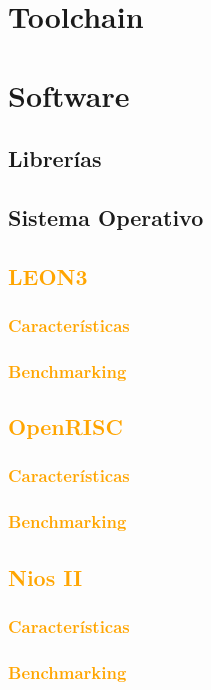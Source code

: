 \documentclass[a4paper,11pt]{article}
\begin{document}
	\section{Toolchain}
	\section{Software}
		\subsection{Librerías}
		\subsection{Sistema Operativo}


	\subsection{\textcolor{orange}{LEON3}}
		\subsubsection{\textcolor{orange}{Características}}
		\subsubsection{\textcolor{orange}{Benchmarking}}
	\subsection{\textcolor{orange}{OpenRISC}}
		\subsubsection{\textcolor{orange}{Características}}
		\subsubsection{\textcolor{orange}{Benchmarking}}
	\subsection{\textcolor{orange}{Nios II}}
		\subsubsection{\textcolor{orange}{Características}}
		\subsubsection{\textcolor{orange}{Benchmarking}}
\end{document}
